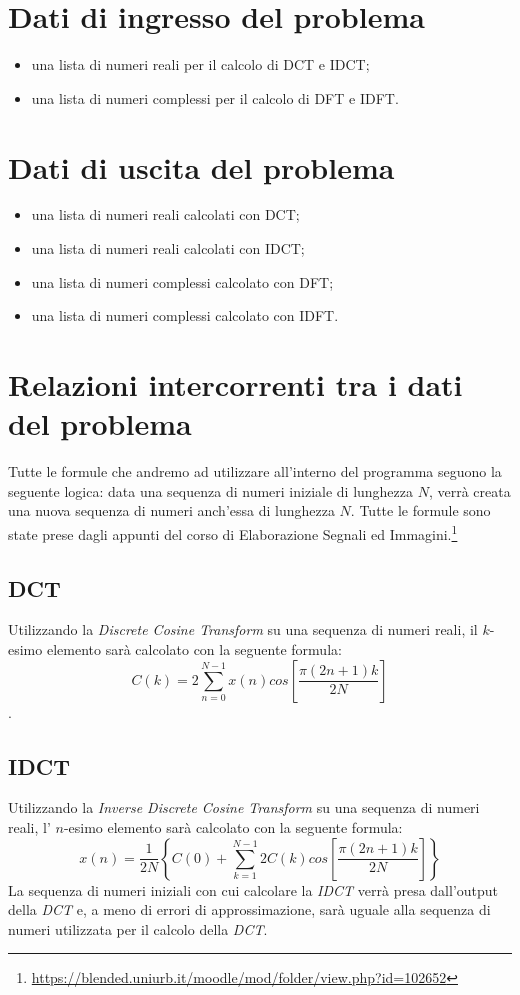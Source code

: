 \documentclass{report}
\begin{document}
	
	\section{Dati di ingresso del problema}
	
	\begin{itemize}
		\item una lista di numeri reali per il calcolo di DCT e IDCT;
		\item una lista di numeri complessi per il calcolo di DFT e IDFT.
	\end{itemize}
	\section{Dati di uscita del problema}
	\begin{itemize}
		\item una lista di numeri reali calcolati con DCT;
		\item una lista di numeri reali calcolati con IDCT;
		\item una lista di numeri complessi calcolato con DFT;
		\item una lista di numeri complessi calcolato con IDFT.
	\end{itemize}
	\section{Relazioni intercorrenti tra i dati del problema}
  Tutte le formule che andremo ad utilizzare all'interno del programma seguono la seguente logica:
  data una sequenza di numeri iniziale di lunghezza $N$, verrà creata una nuova sequenza di numeri anch'essa di lunghezza $N$.
  Tutte le formule sono state prese dagli appunti del corso di Elaborazione Segnali ed Immagini.\footnote{\url{https://blended.uniurb.it/moodle/mod/folder/view.php?id=102652}}
  \subsection{DCT}
  Utilizzando la \textit{Discrete Cosine Transform} su una sequenza di numeri reali, il $k$-esimo elemento sarà calcolato con la seguente formula:
  \[C(k) = 2 \sum_{n = 0}^{N -1} x(n) cos\left[\frac{\pi(2n + 1)k}{2N}\right]\].
  
  \subsection{IDCT}
  Utilizzando la \textit{Inverse Discrete Cosine Transform} su una sequenza di numeri reali, l' $n$-esimo elemento sarà calcolato con la seguente formula:
  \[x(n) = \frac{1}{2N}\left\{C(0) + \sum_{k = 1}^{N -1} 2C(k) cos\left[\frac{\pi(2n + 1)k}{2N}\right]\right\}\]
  \noindent La sequenza di numeri iniziali con cui calcolare la \textit{IDCT} verrà presa dall'output della \textit{DCT} e, a meno di errori di approssimazione, sarà uguale alla sequenza di numeri utilizzata per il calcolo della \textit{DCT}.
\end{document}
